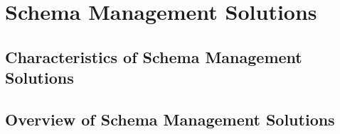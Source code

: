 
\section{Schema Management Solutions}\label{sec:schema-management-solutions}

\subsection{Characteristics of Schema Management Solutions}

\subsection{Overview of Schema Management Solutions}
